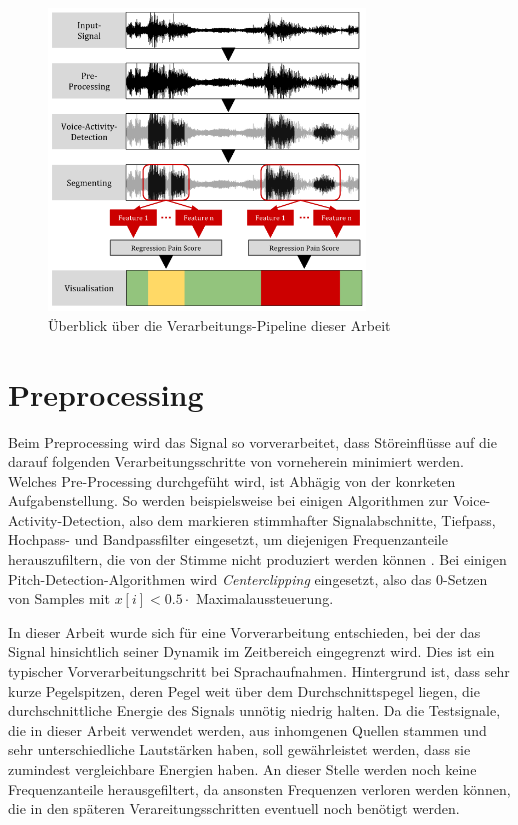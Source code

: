 \begin{figure}[H]
	\centering
	\includegraphics[width=0.75\textwidth]{bilder/pipeline01.png}
	\caption{Überblick über die Verarbeitungs-Pipeline dieser Arbeit}
	\label{img:architecture-overview}
\end{figure}

\section{Preprocessing}
\label{sec:preprocessing}

Beim Preprocessing wird das Signal so vorverarbeitet, dass Störeinflüsse auf die darauf folgenden Verarbeitungsschritte von vorneherein minimiert werden. Welches Pre-Processing durchgefüht wird, ist Abhägig von der konrketen Aufgabenstellung. So werden beispielsweise bei einigen Algorithmen zur Voice-Activity-Detection, also dem markieren stimmhafter Signalabschnitte, Tiefpass, Hochpass- und Bandpassfilter eingesetzt, um diejenigen Frequenzanteile herauszufiltern, die von der Stimme nicht produziert werden können \cite{vad_entropy} \cite{vad_ceps} \cite{vad_kola}. Bei einigen Pitch-Detection-Algorithmen wird \emph{Centerclipping} eingesetzt, also das 0-Setzen von Samples mit $ x[i] < 0.5 \cdot $ Maximalaussteuerung.\cite{czechPitch} 

In dieser Arbeit wurde sich für eine Vorverarbeitung entschieden, bei der das Signal hinsichtlich seiner Dynamik im Zeitbereich eingegrenzt wird. Dies ist ein typischer Vorverarbeitungschritt bei Sprachaufnahmen. Hintergrund ist, dass sehr kurze Pegelspitzen, deren Pegel weit über dem Durchschnittspegel liegen, die durchschnittliche Energie des Signals unnötig niedrig halten. Da die Testsignale, die in dieser Arbeit verwendet werden, aus inhomgenen Quellen stammen und sehr unterschiedliche Lautstärken haben, soll gewährleistet werden, dass sie zumindest vergleichbare Energien haben. An dieser Stelle werden noch keine Frequenzanteile herausgefiltert, da ansonsten Frequenzen verloren werden können, die in den späteren Verareitungsschritten eventuell noch benötigt werden.

